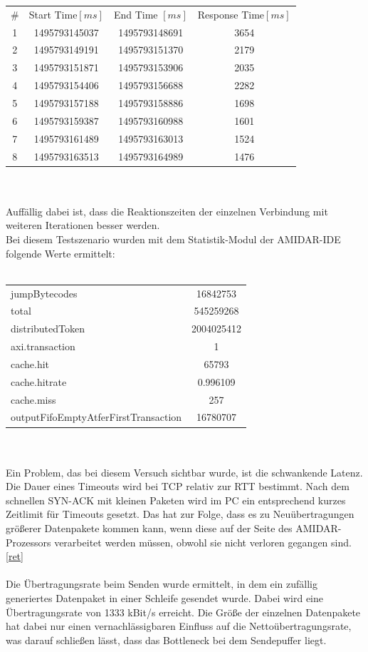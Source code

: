 \begin{tabular}{cccc}
\# & Start Time$[ms]$ & End Time $[ms]$ & Response Time$[ms]$\\
1 &1495793145037&	1495793148691&	3654\\
2 &1495793149191&	1495793151370&	2179\\
3 &1495793151871&	1495793153906&	2035\\
4 &1495793154406&	1495793156688&	2282\\
5 &1495793157188&	1495793158886&	1698\\
6 &1495793159387&	1495793160988&	1601\\
7 &1495793161489&	1495793163013&	1524\\
8 &1495793163513&	1495793164989&	1476\\
\end{tabular}\\\\
Auffällig dabei ist, dass die Reaktionszeiten der einzelnen Verbindung mit weiteren Iterationen besser werden. \\
Bei diesem Testszenario wurden mit dem Statistik-Modul der AMIDAR-IDE folgende Werte ermittelt:\\\\
\begin{tabular}{lc}
jumpBytecodes & 16842753\\
total & 545259268 \\
distributedToken & 2004025412 \\
axi.transaction& 1\\
cache.hit & 65793\\
cache.hitrate& 0.996109\\
cache.miss& 257\\
outputFifoEmptyAtferFirstTransaction&16780707
\end{tabular}\\\\
Ein Problem, das bei diesem Versuch sichtbar wurde, ist die schwankende Latenz. Die Dauer eines Timeouts wird bei TCP relativ zur RTT bestimmt. Nach dem schnellen SYN-ACK mit kleinen Paketen wird im PC ein entsprechend kurzes Zeitlimit für Timeouts gesetzt. Das hat zur Folge, dass es zu Neuübertragungen größerer Datenpakete kommen kann, wenn diese auf der Seite des AMIDAR-Prozessors verarbeitet werden müssen, obwohl sie nicht verloren gegangen sind. \autoref{ret} \\\\
Die Übertragungsrate beim Senden wurde ermittelt, in dem ein zufällig generiertes Datenpaket in einer Schleife gesendet wurde. Dabei wird eine Übertragungsrate von 1333 kBit/s erreicht. Die Größe der einzelnen Datenpakete hat dabei nur einen vernachlässigbaren Einfluss auf die Nettoübertragungsrate, was darauf schließen lässt, dass das Bottleneck bei dem Sendepuffer liegt. \\\\
